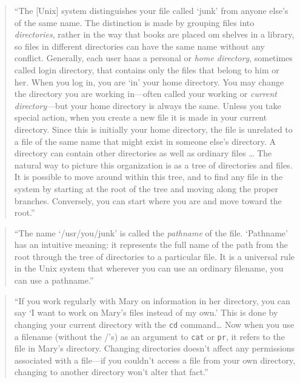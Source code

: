 \documentclass[]{tufte-book}
\begin{document}
\begin{quote}
``The {[}Unix{]} system distinguishes your file called `junk' from anyone else's of the same name. The
distinction is made by grouping files into \emph{directories}, rather in the way that books are placed om
shelves in a library, so files in different directories can have the same name without any conflict.
Generally, each user haas a personal or \emph{home directory}, sometimes called login directory, that
contains only the files that belong to him or her. When you log in, you are `in' your home directory.
You may change the directory you are working in---often called your working or \emph{current directory}---but
your home directory is always the same. Unless you take special action, when you create a new file it is
made in your current directory. Since this is initially your home directory, the file is unrelated
to a file of the same name that might exist in someone else's directory. A directory can contain
other directories as well as ordinary files \ldots{} The natural way to picture this organization is as a
tree of directories and files. It is possible to move around within this tree, and to find any file in the system
by starting at the root of the tree and moving along the proper branches. Conversely, you can start where
you are and move toward the root.'' \citep{kernighan1984unix}
\end{quote}

\begin{quote}
``The name `/usr/you/junk' is called the \emph{pathname} of the file. `Pathname' has an intuitive meaning:
it represents the full name of the path from the root through the tree of directories to a particular
file. It is a universal rule in the Unix system that wherever you can use an ordinary filename, you can
use a pathname.'' \citep{kernighan1984unix}
\end{quote}

\begin{quote}
``If you work regularly with Mary on information in her directory, you can say `I want to work on Mary's
files instead of my own.' This is done by changing your current directory with the \texttt{cd} command\ldots{}
Now when you use a filename (without the /'s) as an argument to \texttt{cat} or \texttt{pr}, it refers to the file
in Mary's directory. Changing directories doesn't affect any permissions associated with a file---if you
couldn't access a file from your own directory, changing to another directory won't alter that fact.'' \citep{kernighan1984unix}
\end{quote}
\end{document}
